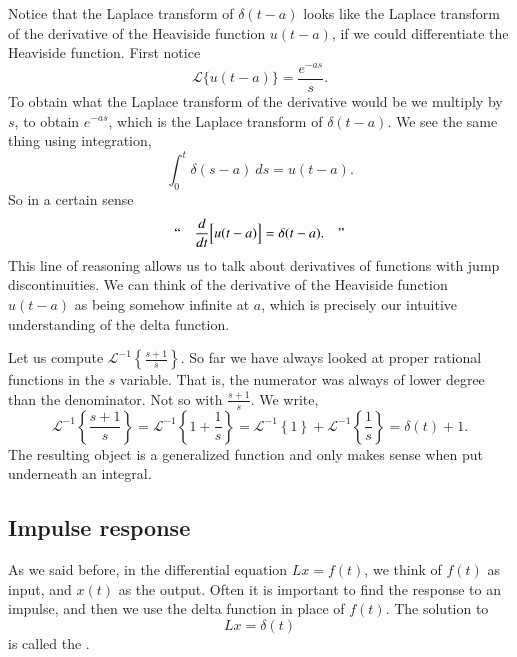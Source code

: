 \documentclass[12pt]{book}
\begin{document}
\begin{remark}
Notice that the Laplace transform of $\delta(t-a)$ looks like
the Laplace transform of the derivative of the Heaviside function
$u(t-a)$, if we could differentiate the Heaviside function.
First notice
\begin{equation*}
{\mathcal{L}} \bigl\{ u(t-a) \bigr\} = \frac{e^{-as}}{s}.
\end{equation*}
To obtain what the Laplace transform of the derivative would be
we multiply by $s$, to obtain $e^{-as}$, which is the Laplace transform
of $\delta(t-a)$.
We see the same thing using integration,
\begin{equation*}
\int_0^t \delta(s-a)~ds = u(t-a) .
\end{equation*}
So in a certain sense
\begin{equation*}
\text{``} \quad \frac{d}{dt} \Bigl[ u(t-a) \Bigr] = \delta(t-a) . \quad \text{''}
\end{equation*}
This line of reasoning allows us to talk about derivatives of functions with jump
discontinuities.
We can think of
the derivative of the Heaviside function $u(t-a)$ as being somehow infinite
at $a$, which is precisely our intuitive understanding of the delta
function.
\end{remark}

\begin{example}
Let us compute ${\mathcal{L}}^{-1} \left\{ \frac{s+1}{s} \right\}$.  So
far we have always looked at proper rational functions in the $s$ variable.
That is, the numerator was always of lower degree than the denominator.
Not so with $\frac{s+1}{s}$.
We write,
\begin{equation*}
{\mathcal{L}}^{-1} \left\{ \frac{s+1}{s} \right\}
=
{\mathcal{L}}^{-1} \left\{ 1 + \frac{1}{s} \right\}
=
{\mathcal{L}}^{-1} \left\{ 1 \right\}
+
{\mathcal{L}}^{-1} \left\{ \frac{1}{s} \right\}
=
\delta(t) + 1 .
\end{equation*}
The resulting object is a generalized
function and only makes sense when put underneath an integral.
\end{example}

\subsection{Impulse response}

As we said before, in the differential equation
$L x = f(t)$,
we think of $f(t)$ as input, and $x(t)$ as the output.  Often it is important
to find the response to an impulse, and then we use
the delta function in place of $f(t)$.
The solution to
\begin{equation*}
L x = \delta(t)
\end{equation*}
is called the
\emph{}.
\end{document}
